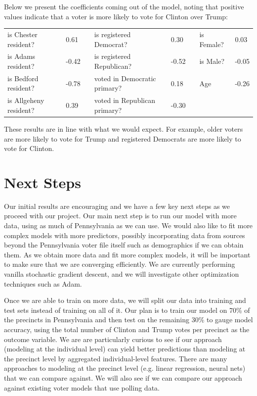 \documentclass[10pt, letterpaper]{article}
\begin{document}
Below we present the coefficients coming out of the model, noting that positive values indicate that a voter is more likely to vote for Clinton over Trump:

\begin{table}[H]
\centering
\begin{tabular}{|l|l|l|l|l|lll}
\cline{1-2} \cline{4-5} \cline{7-8}
is Chester resident?   & 0.61  &  & is registered Democrat?      & 0.30  & \multicolumn{1}{l|}{} & \multicolumn{1}{l|}{is Female?} & \multicolumn{1}{l|}{0.03}  \\ \cline{1-2} \cline{4-5} \cline{7-8} 
is Adams resident?     & -0.42 &  & is registered Republican?    & -0.52 & \multicolumn{1}{l|}{} & \multicolumn{1}{l|}{is Male?}   & \multicolumn{1}{l|}{-0.05} \\ \cline{1-2} \cline{4-5} \cline{7-8} 
is Bedford resident?   & -0.78 &  & voted in Democratic primary? & 0.18  & \multicolumn{1}{l|}{} & \multicolumn{1}{l|}{Age}        & \multicolumn{1}{l|}{-0.26} \\ \cline{1-2} \cline{4-5} \cline{7-8} 
is Allgeheny resident? & 0.39  &  & voted in Republican primary? & -0.30 &                       &                                 &                            \\ \cline{1-2} \cline{4-5}
\end{tabular}
\end{table}
These results are in line with what we would expect. For example, older voters are more likely to vote for Trump and registered Democrats are more likely to vote for Clinton.

\section{Next Steps}

Our initial results are encouraging and we have a few key next steps as we proceed with our project. Our main next step is to run our model with more data, using as much of Pennsylvania as we can use. We would also like to fit more complex models with more predictors, possibly incorporating data from sources beyond the Pennsylvania voter file itself such as demographics if we can obtain them. As we obtain more data and fit more complex models, it will be important to make sure that we are converging efficiently. We are currently performing vanilla stochastic gradient descent, and we will investigate other optimization techniques such as Adam.

Once we are able to train on more data, we will split our data into training and test sets instead of training on all of it. Our plan is to train our model on 70\% of the precincts in Pennsylvania and then test on the remaining 30\% to gauge model accuracy, using the total number of Clinton and Trump votes per precinct as the outcome variable. We are are particularly curious to see if our approach (modeling at the individual level) can yield better predictions than modeling at the precinct level by aggregated individual-level features. There are many approaches to modeling at the precinct level (e.g. linear regression, neural nets) that we can compare against. We will also see if we can compare our approach against existing voter models that use polling data.
\end{document}
